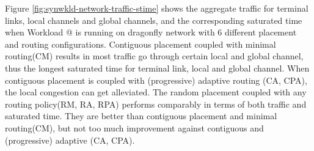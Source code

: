\documentclass[conference,compsoc]{IEEEtran}
\makeatletter
\newcommand{\Rmnum}[1]{\expandafter\@slowromancap\romannumeral #1@}
\makeatother
\begin{document}
Figure \ref{fig:synwkld-network-traffic-stime} shows the aggregate traffic for terminal links, local channels and global channels, and the corresponding saturated time when Workload \Rmnum{2} is running on dragonfly network with 6 different placement and routing configurations. Contiguous placement coupled with minimal routing(CM) results in most traffic go through certain local and global channel, thus the longest saturated time for terminal link, local and global channel. When contiguous placement is coupled with (progressive) adaptive routing (CA, CPA), the local congestion can get alleviated. The random placement coupled with any routing policy(RM, RA, RPA) performs comparably in terms of both traffic and saturated time. They are better than contiguous placement and minimal routing(CM), but not too much improvement against contiguous and (progressive) adaptive (CA, CPA).
\end{document}
